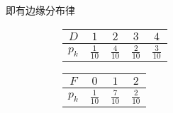 即有边缘分布律
\bgroup
\def\arraystretch{2}
\setlength\tabcolsep{0.5cm}
\begin{figure}[H]
\centering
\begin{subfigure}[t]{0.48\linewidth}
  \centering
    \begin{tabular}{c|cccc}
      \hline
      $D$ & $1$ & $2$ & $3$ & $4$ \\
      \hline
      $p_k$ & $\frac{1}{10}$ & $\frac{4}{10}$ & $\frac{2}{10}$ & $\frac{3}{10}$ \\
      \hline
    \end{tabular}
\end{subfigure}
\begin{subfigure}[t]{0.48\linewidth}
  \centering
    \begin{tabular}{c|ccc}
      \hline
      $F$ & $0$ & $1$ & $2$ \\
      \hline
      $p_k$ & $\frac{1}{10}$ & $\frac{7}{10}$ & $\frac{2}{10}$ \\
      \hline
    \end{tabular}
\end{subfigure}
\end{figure}
\egroup
